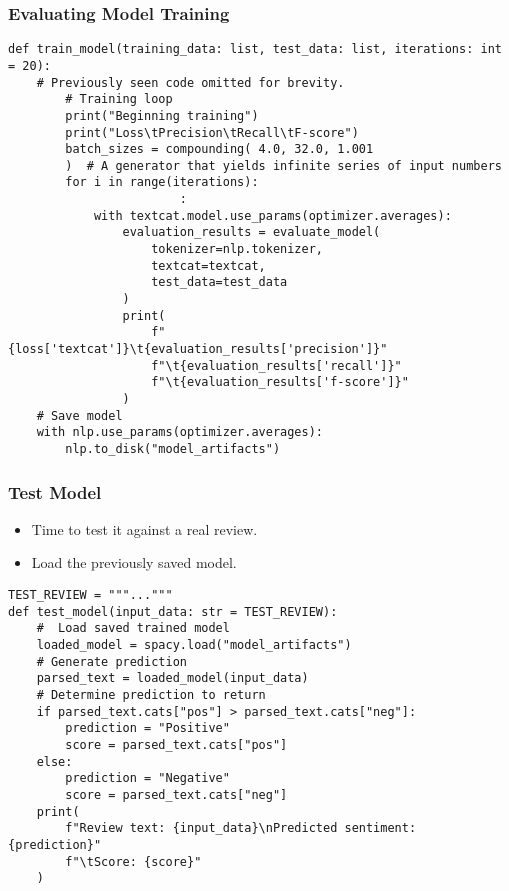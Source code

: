 \begin{frame}[fragile]\frametitle{Evaluating Model Training }

\begin{lstlisting}
def train_model(training_data: list, test_data: list, iterations: int = 20):
    # Previously seen code omitted for brevity.
        # Training loop
        print("Beginning training")
        print("Loss\tPrecision\tRecall\tF-score")
        batch_sizes = compounding( 4.0, 32.0, 1.001
        )  # A generator that yields infinite series of input numbers
        for i in range(iterations):
						:
            with textcat.model.use_params(optimizer.averages):
                evaluation_results = evaluate_model(
                    tokenizer=nlp.tokenizer,
                    textcat=textcat,
                    test_data=test_data
                )
                print(
                    f"{loss['textcat']}\t{evaluation_results['precision']}"
                    f"\t{evaluation_results['recall']}"
                    f"\t{evaluation_results['f-score']}"
                )		
    # Save model
    with nlp.use_params(optimizer.averages):
        nlp.to_disk("model_artifacts")								
\end{lstlisting}

\end{frame}

\begin{frame}[fragile]\frametitle{Test Model}

\begin{itemize}
\item Time to test it against a real review.
\item Load the previously saved model.
\end{itemize}

\begin{lstlisting}
TEST_REVIEW = """..."""				
def test_model(input_data: str = TEST_REVIEW):
    #  Load saved trained model
    loaded_model = spacy.load("model_artifacts")
    # Generate prediction
    parsed_text = loaded_model(input_data)
    # Determine prediction to return
    if parsed_text.cats["pos"] > parsed_text.cats["neg"]:
        prediction = "Positive"
        score = parsed_text.cats["pos"]
    else:
        prediction = "Negative"
        score = parsed_text.cats["neg"]
    print(
        f"Review text: {input_data}\nPredicted sentiment: {prediction}"
        f"\tScore: {score}"
    )			
\end{lstlisting}

\end{frame}

